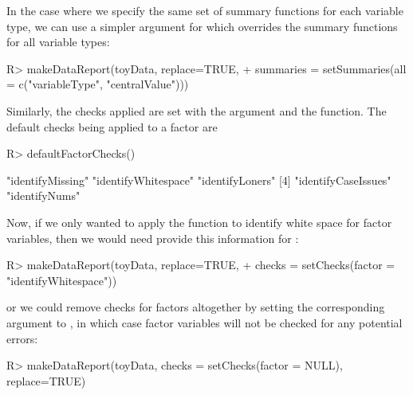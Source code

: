 \documentclass[article,shortnames]{jss}
\begin{document}
In the case where we specify the same set of summary
functions for each variable type, we can use a simpler argument for  which overrides the summary functions for all
variable types:


\begin{Schunk}
\begin{Sinput}
R> makeDataReport(toyData, replace=TRUE,                               
+    summaries = setSummaries(all = c("variableType", "centralValue")))
\end{Sinput}
\end{Schunk}

Similarly, the checks applied are set with the  argument and the  function. The default checks being applied to a factor are

\begin{Schunk}
\begin{Sinput}
R> defaultFactorChecks()
\end{Sinput}
\begin{Soutput}
[1] "identifyMissing"    "identifyWhitespace" "identifyLoners"    
[4] "identifyCaseIssues" "identifyNums"      
\end{Soutput}
\end{Schunk}

Now, if we only wanted to apply the function to identify white space
for factor variables, then we would need provide this information for :

\begin{Schunk}
\begin{Sinput}
R> makeDataReport(toyData, replace=TRUE,
+    checks = setChecks(factor = "identifyWhitespace"))
\end{Sinput}
\end{Schunk}

or we could remove checks for factors altogether by setting the
corresponding argument to , in which case factor variables will
not be checked for any potential errors:

\begin{Schunk}
\begin{Sinput}
R> makeDataReport(toyData, checks = setChecks(factor = NULL), replace=TRUE)
\end{Sinput}
\end{Schunk}
\end{document}
